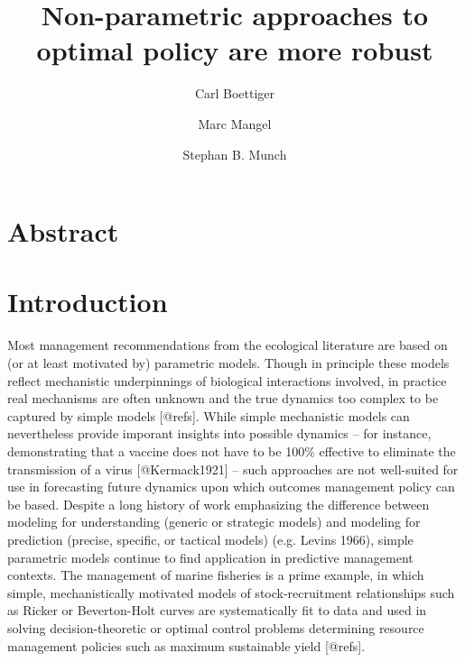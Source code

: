 \documentclass[author-year, review]{elsarticle} %
\begin{document}
\begin{frontmatter}
  \title{Non-parametric approaches to optimal policy are more robust}
  \author[cstar]{Carl Boettiger}
  \author[cstar]{Marc Mangel}
  \author[noaa]{Stephan B. Munch}
  \address[cstar]{Center for Stock Assessment Research, Department of Applied Math and Statistics, University of California, Mail Stop SOE-2, Santa Cruz, CA 95064, USA}
  \address[noaa]{Southwest Fisheries Science Center, National Oceanic and Atmospheric Administration, 110 Shaffer Road, Santa Cruz, CA 95060, USA}
 \end{frontmatter}


\section{Abstract}

\section{Introduction}

Most management recommendations from the ecological literature are based
on (or at least motivated by) parametric models. Though in principle
these models reflect mechanistic underpinnings of biological
interactions involved, in practice real mechanisms are often unknown and
the true dynamics too complex to be captured by simple models
{[}@refs{]}. While simple mechanistic models can nevertheless provide
imporant insights into possible dynamics -- for instance, demonstrating
that a vaccine does not have to be 100\% effective to eliminate the
transmission of a virus {[}@Kermack1921{]} -- such approaches are not
well-suited for use in forecasting future dynamics upon which outcomes
management policy can be based. Despite a long history of work
emphasizing the difference between modeling for understanding (generic
or strategic models) and modeling for prediction (precise, specific, or
tactical models) (e.g. Levins 1966), simple parametric models continue
to find application in predictive management contexts. The management of
marine fisheries is a prime example, in which simple, mechanistically
motivated models of stock-recruitment relationships such as Ricker or
Beverton-Holt curves are systematically fit to data and used in solving
decision-theoretic or optimal control problems determining resource
management policies such as maximum sustainable yield {[}@refs{]}.
\end{document}

